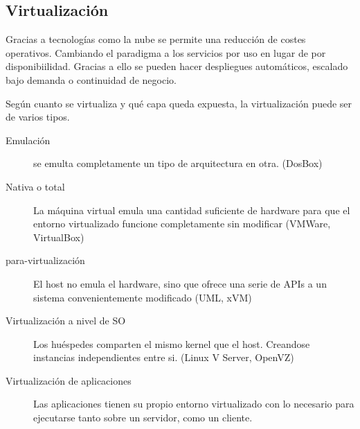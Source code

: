 \subsection{Virtualización}
Gracias a tecnologías como la nube se permite una reducción de costes operativos. Cambiando el paradigma a los servicios por uso en lugar de por disponibiilidad. Gracias a ello se pueden hacer despliegues automáticos, escalado bajo demanda o continuidad de negocio.

Según cuanto se virtualiza y qué capa queda expuesta, la virtualización puede ser de varios tipos.
\begin{description}
    \item[Emulación] se emulta completamente un tipo de arquitectura en otra. (DosBox)
    \item[Nativa o total] La máquina virtual emula una cantidad suficiente de hardware para que el entorno virtualizado funcione completamente sin modificar (VMWare, VirtualBox)
    \item[para-virtualización] El host no emula el hardware, sino que ofrece una serie de APIs a un sistema convenientemente modificado (UML, xVM)
    \item[Virtualización a nivel de SO] Los huéspedes comparten el mismo kernel que el host. Creandose instancias independientes entre si. (Linux V Server, OpenVZ)
    \item[Virtualización de aplicaciones] Las aplicaciones tienen su propio entorno virtualizado con lo necesario para ejecutarse tanto sobre un servidor, como un cliente.
\end{description}